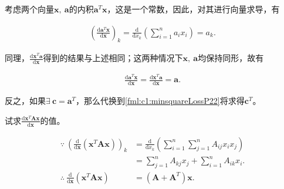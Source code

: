 	\begin{example}
		考虑两个向量$\mathbf{x},~\mathbf{a}$的内积$\mathbf{a}^T \mathbf{x}$，这是一个常数，因此，对其进行向量求导，有
		
		\begin{equation}\label{fml:c1:minsquareLossP2}
			\begin{aligned}
				\left( \frac{\mathrm{d} \mathbf{a}^T \mathbf{x} }{\mathrm{d}\mathbf{x}} \right)_k = \frac{\mathrm{d}}{\mathrm{d} x_k} \left( \sum\limits_{i=1}^{n}{ a_i x_i } \right) = a_k.
			\end{aligned}
		\end{equation}
		
		同理，$\frac{\mathrm{d} \mathbf{x}^T \mathbf{a} }{\mathrm{d}\mathbf{x}}$得到的结果与上述相同；这两种情况下$\mathbf{x},~\mathbf{a}$均保持同形，故有
		
		\begin{equation}\label{fml:c1:minsquareLossP22}
			\begin{aligned}
				\frac{\mathrm{d} \mathbf{a}^T \mathbf{x} }{\mathrm{d}\mathbf{x}} = \frac{\mathrm{d} \mathbf{x}^T \mathbf{a} }{\mathrm{d}\mathbf{x}} = \mathbf{a}.
			\end{aligned}
		\end{equation}
		
		反之，如果$\exists~\mathbf{c}=\mathbf{a}^T$，那么代换到\eqref{fml:c1:minsquareLossP22}将求得$\mathbf{c}^T$。
	\end{example}
    
	\begin{example}
		试求$\frac{\mathrm{d} \mathbf{x}^T \mathbf{A} \mathbf{x}}{\mathrm{d}\mathbf{x}}$的值。

		\begin{equation}\label{fml:c1:minsquareLossP1}
			\begin{aligned}
				\because~\left(\frac{\mathrm{d}}{\mathrm{d}\mathbf{x}} \left( \mathbf{x}^T \mathbf{A} \mathbf{x}\right) \right)_k &= \frac{\mathrm{d}}{\mathrm{d}x_k} \left( \sum\limits_{i=1}^{n}{ \sum\limits_{j=1}^{n}{ A_{ij} x_i x_j } } \right)\\
				&= \sum\limits_{j=1}^{n}{ A_{kj} x_j } + \sum\limits_{i=1}^{n}{ A_{ik} x_i }.\\
				\therefore~\frac{\mathrm{d}}{\mathrm{d}\mathbf{x}} \left( \mathbf{x}^T \mathbf{A} \mathbf{x} \right) &= (\mathbf{A}+\mathbf{A}^T)\mathbf{x}.
			\end{aligned}
		\end{equation}
	\end{example}

